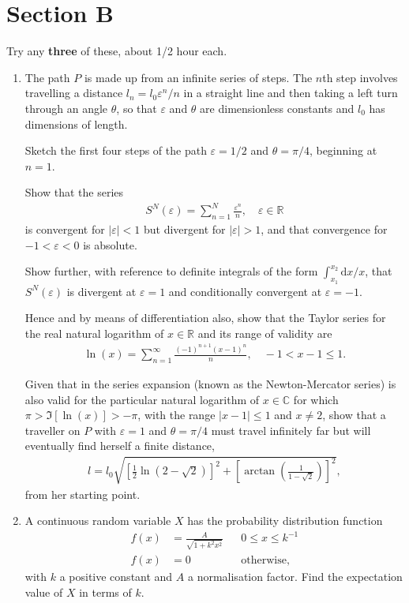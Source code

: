 \documentclass[10pt]{iopart}
\begin{document}
\section*{Section B}\label{sb}
Try any \textbf{three} of these, about 1/2 hour each.
\begin{enumerate}[label=B\arabic*)]
\item	The path $P$ is made up from an infinite series of steps. The $n$th step involves travelling a distance $l_n=l_0\varepsilon^n/n$ in a straight line and then taking a left turn through an angle $\theta$, so that $\varepsilon$ and $\theta$ are dimensionless constants and $l_0$ has dimensions of length. 

\hfill\break
Sketch the first four steps of the path $\varepsilon=1/2$ and $\theta=\pi/4$, beginning at $n=1$.

\hfill\break
Show that the series
\begin{eqnarray}
S^{N}(\varepsilon)=\sum_{n=1}^{N}\frac{\varepsilon^n}{n}, \quad \varepsilon\in\mathbb{R}
\end{eqnarray}
is convergent for $|\varepsilon|<1$ but divergent for $|\varepsilon|>1$, and that convergence for $-1<\varepsilon<0$ is absolute.

\hfill\break
Show further, with reference to definite integrals of the form $\int_{x_1}^{x_2}\mathrm{d}x/x$, that $S^N(\varepsilon)$ is divergent at $\varepsilon=1$ and conditionally convergent at $\varepsilon=-1$.

\hfill\break
Hence and by means of differentiation also, show that the Taylor series for the real natural logarithm of $x\in\mathbb{R}$ and its range of validity are
\begin{eqnarray}\label{one}
\ln(x)=\sum_{n=1}^{\infty}\frac{(-1)^{n+1}(x-1)^n}{n}, \quad -1<x-1\leq 1.
\end{eqnarray}

\hfill\break
Given that in  the series expansion (known as the Newton-Mercator series) is also valid for the particular natural logarithm of $x\in\mathbb{C}$ for which $\pi>\mathfrak{I}[\ln(x)]>-\pi$, with the range $|x-1|\leq1$ and $x\neq 2$, show that a traveller on $P$ with $\varepsilon=1$ and $\theta=\pi/4$ must travel infinitely far but will eventually find herself a finite distance,
\begin{eqnarray}
l=l_0\sqrt{\left[\frac{1}{2}\ln\left(2-\sqrt{2}\right)\right]^2+\left[\arctan\left(\frac{1}{1-\sqrt{2}}\right)\right]^2},
\end{eqnarray}
from her starting point.
\item   A continuous random variable $X$ has the probability distribution function
\begin{eqnarray}
		f(x) &= \frac{A}{\sqrt{1+k^{2}x^{2}}} & &0\leq x\leq k^{-1} \\
		f(x) &= 0 & &\mathrm{otherwise,}
\end{eqnarray}
with $k$ a positive constant and $A$ a normalisation factor. Find the expectation value of $X$ in terms of $k$.


\end{enumerate}
\end{document}
